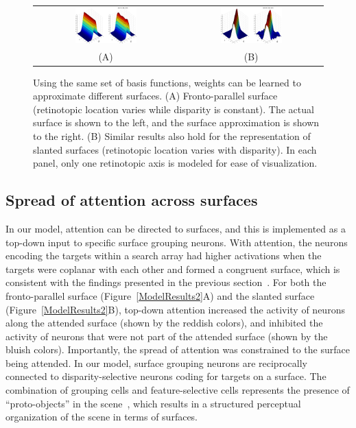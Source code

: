 \begin{figure}[t]
\centering
\begin{tabular}{c c}
\includegraphics[width=0.45\textwidth]{3D-Surface/figs/frontoparallel} &
\includegraphics[width=0.45\textwidth]{3D-Surface/figs/slanted}\\
(A) & (B)
\end{tabular}
\makeatletter
\let\@currsize\normalsize
\caption[Comparison of basis function approximations to true surfaces]{Using the same set of basis functions, weights can be learned to approximate different surfaces. (A) Fronto-parallel surface (retinotopic location varies while disparity is constant). The actual surface is shown to the left, and the surface approximation is shown to the right. (B) Similar results also hold for the representation of slanted surfaces (retinotopic location varies with disparity). In each panel, only one retinotopic axis is modeled for ease of visualization.}
\label{Surface_basisfunc}
\end{figure}

\subsection{Spread of attention across surfaces}

In our model, attention can be directed to surfaces, and this is implemented as a top-down input to specific surface grouping neurons. With attention, the neurons encoding the targets within a search array had higher activations when the targets were coplanar with each other and formed a congruent surface, which is consistent with the findings presented in the previous section~\citep{He_Nakayama95}. For both the fronto-parallel surface (Figure~\ref{ModelResults2}A) and the slanted surface (Figure~\ref{ModelResults2}B), top-down attention increased the activity of neurons along the attended surface (shown by the reddish colors), and inhibited the activity of neurons that were not part of the attended surface (shown by the bluish colors). Importantly, the spread of attention was constrained to the surface being attended. In our model, surface grouping neurons are reciprocally connected to disparity-selective neurons coding for targets on a surface. The combination of grouping cells and feature-selective cells represents the presence of ``proto-objects'' in the scene~\citep{Rensink00a}, which results in a structured perceptual organization of the scene in terms of surfaces.


